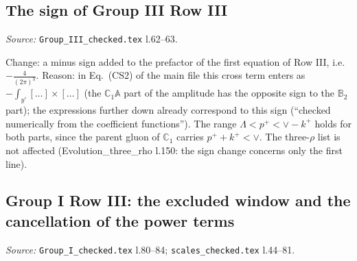 \documentclass[10pt]{article}
\def\mf#1{\mathbb{#1}}
\begin{document}
\subsection{The sign of Group III Row III}\label{sec:calc-G3R3}
\noindent\emph{Source:} \texttt{Group\_III\_checked.tex} l.62--63.

\noindent Change: a minus sign added to the prefactor of the first equation of Row III, i.e.\ $-\frac{4}{(2\pi)^{3}}$. Reason: in Eq.~(CS2) of the main file this cross term enters as $-\int_{y'}[\dots]\times[\dots]$ (the $\mf{C}_{1}\mf{A}$ part of the amplitude has the opposite sign to the $\mf{B}_{2}$ part); the expressions further down already correspond to this sign (``checked numerically from the coefficient functions''). The range $\Lambda<p^{+}<\vee-k^{+}$ holds for both parts, since the parent gluon of $\mf{C}_{1}$ carries $p^{+}+k^{+}<\vee$. The three-$\rho$ list is not affected (Evolution\_three\_rho l.150: the sign change concerns only the first line).

\subsection{Group I Row III: the excluded window and the cancellation of the power terms}\label{sec:calc-scales}
\noindent\emph{Source:} \texttt{Group\_I\_checked.tex} l.80--84; \texttt{scales\_checked.tex} l.44--81.
\end{document}
